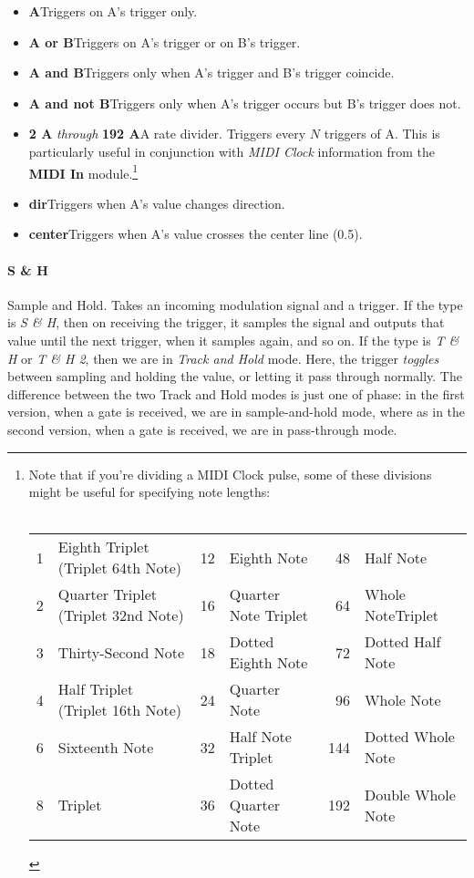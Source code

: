 \documentclass{article}
\begin{document}
\begin{itemize}
\item {\bf A}\quad Triggers on A's trigger only.
\item {\bf A or B}\quad Triggers on A's trigger or on B's trigger.
\item {\bf A and B}\quad Triggers only when A's trigger and B's trigger coincide.
\item {\bf A and not B}\quad Triggers only when A's trigger occurs but B's trigger does not.
\item {\bf 2 A} {\it through} {\bf 192 A}\quad A rate divider.  Triggers every \(N\) triggers of A.  This is particularly useful in conjunction with {\it MIDI Clock} information from the {\bf MIDI In} module.\footnote{Note that if you're dividing a MIDI Clock pulse, some of these divisions might be useful for specifying note lengths:\\
\\
\begin{tabular}{rlrlrl}
	1&	Eighth Triplet (Triplet 64th Note)	&12&	Eighth Note							&48&	Half Note		\\
	2&	Quarter Triplet (Triplet 32nd Note)	&16&	Quarter Note Triplet					&64&	Whole NoteTriplet\\
	3&	Thirty-Second Note				&18&	Dotted Eighth Note				&72&	Dotted Half Note\\
	4&	Half Triplet (Triplet 16th Note)		&24&	Quarter Note				&96&	Whole Note\\
	6&	Sixteenth Note					&32&	Half Note Triplet				&144&	Dotted Whole Note\\
	8&	Triplet								&36&	Dotted Quarter Note									&192&	Double Whole Note\\
\end{tabular}\vspace{1em}
}
\item{\bf dir}\quad Triggers when A's value changes direction.
\item{\bf center}\quad Triggers when A's value crosses the center line (0.5).
\end{itemize}

\paragraph{S \& H}  Sample and Hold.  Takes an incoming modulation signal and a trigger.  If the type is {\it S \& H}, then on receiving the trigger, it samples the signal and outputs that value until the next trigger, when it samples again, and so on.  If the type is {\it T \& H} or {\it T \& H 2}, then we are in {\it Track and Hold} mode.  Here, the trigger {\it toggles} between sampling and holding the value, or letting it pass through normally.  The difference between the two Track and Hold modes is just one of phase: in the first version, when a gate is received, we are in sample-and-hold mode, where as in the second version, when a gate is received, we are in pass-through mode.
\end{document}
